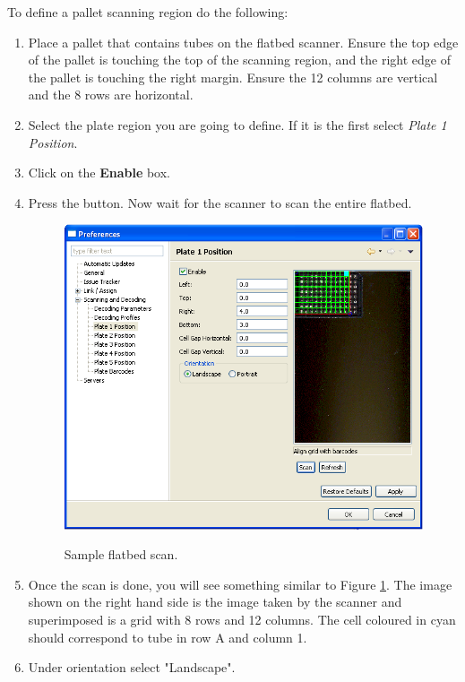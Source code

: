 To define a pallet scanning region do the following:
\begin{enumerate}
  \item Place a pallet that contains tubes on the flatbed scanner. Ensure the
    top edge of the pallet is touching the top of the scanning region, and the right
    edge of the pallet is touching the right margin. Ensure the 12 columns
    are vertical and the 8 rows are horizontal.
  \item Select the plate region you are going to define.  If it is the first
    select \emph{Plate 1 Position}.
  \item Click on the \textbf{Enable} box.
    \clearpage

  \item Press the  button. Now wait for the scanner to scan the entire
    flatbed.
    \begin{figure}[H]
      \centering
      \scalebox{0.5}
      { \includegraphics*{screenshots/configuration/sample_flatbed_scan} }
      \caption{Sample flatbed scan.}
      \label{fig:sample_flatbed_scan}
    \end{figure}
  \item Once the scan is done, you will see something similar to Figure
    \ref{fig:sample_flatbed_scan}. The image shown on the right hand side is
    the image taken by the scanner and superimposed is a grid with 8 rows and
    12 columns. The cell coloured in cyan should correspond to tube in row A and
    column 1.
  \item Under orientation select "Landscape".

\end{enumerate}
